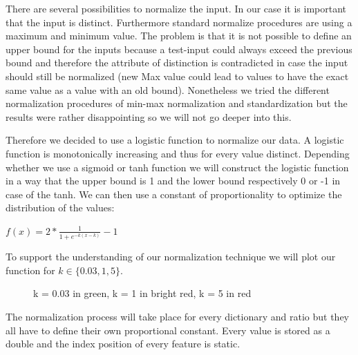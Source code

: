 \documentclass[paper=A4,pagesize=auto,12pt,headinclude=true,footinclude=true,BCOR=0mm,DIV=calc]{scrartcl}
\begin{document}
	
	There are several possibilities to normalize the input. In our case it is important that the input is distinct. Furthermore standard normalize procedures are using a maximum and minimum value. The problem is that it is not possible to define an upper bound for the inputs because a test-input could always exceed the previous bound and therefore the attribute of distinction is contradicted in case the input should still be normalized (new Max value could lead to values to have the exact same value as a value with an old bound). Nonetheless we tried the different normalization procedures of min-max normalization and standardization but the results were rather disappointing so we will not go deeper into this.
	
	
	Therefore we decided to use a logistic function to normalize our data. A logistic function is monotonically increasing and thus for every value distinct. Depending whether we use a sigmoid or tanh function we will construct the logistic function in a way that the upper bound is 1 and the lower bound respectively 0 or -1 in case of the tanh. 
	We can then use a constant of proportionality to optimize the distribution of the values:
	
	$f(x) = 2 * \frac{1}{1 + e^{-k(x-k)}} -1$
	
	To support the understanding of our normalization technique we will plot our function for $k \in \{0.03, 1, 5\}$.\\
	\begin{figure}[H]
		\caption{k = 0.03 in green, k = 1 in bright red, k = 5 in red}
	\end{figure}
	
	The normalization process will take place for every dictionary and ratio but they all have to define their own proportional constant.
	Every value is stored as a double and the index position of every feature is static.
	
\end{document}
